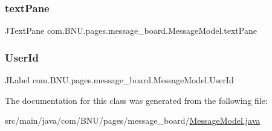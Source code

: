\subsubsection{\texorpdfstring{text\+Pane}{textPane}}
{\footnotesize\ttfamily J\+Text\+Pane com.\+B\+N\+U.\+pages.\+message\+\_\+board.\+Message\+Model.\+text\+Pane\hspace{0.3cm}{\ttfamily [private]}}

\mbox{\label{classcom_1_1_b_n_u_1_1pages_1_1message__board_1_1_message_model_a29f9c399689c1c0278557b512d8a28c9}} 
\subsubsection{\texorpdfstring{User\+Id}{UserId}}
{\footnotesize\ttfamily J\+Label com.\+B\+N\+U.\+pages.\+message\+\_\+board.\+Message\+Model.\+User\+Id\hspace{0.3cm}{\ttfamily [private]}}



The documentation for this class was generated from the following file\+:\begin{DoxyCompactItemize}
\item 
src/main/java/com/\+B\+N\+U/pages/message\+\_\+board/\mbox{\hyperlink{_message_model_8java}{Message\+Model.\+java}}\end{DoxyCompactItemize}
